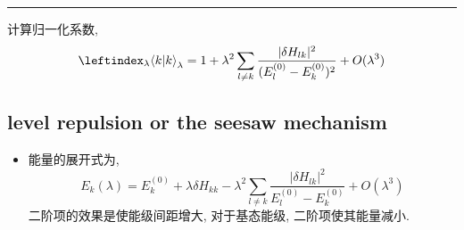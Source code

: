 \begin{itemize}
\begin{tcolorbox}[title=calculation:]
		\noindent\rule[0.5ex]{\linewidth}{0.5pt} %
		
		计算归一化系数,
		\begin{equation}
			\leftindex_\lambda {\braket{k | k}}_\lambda = 1 + \lambda^2 \sum_{l \neq k} \frac{|\delta H_{l k}|^2}{(E_l^{(0)} - E_k^{(0)})^2} + O(\lambda^3)
		\end{equation}
	\end{tcolorbox}
\end{itemize}

\subsection{level repulsion or the seesaw mechanism} \label{subsection C.1.1}
\begin{itemize}
	\item 能量的展开式为,
	\begin{equation}
		E_k(\lambda) = E_k^{(0)} + \lambda \delta H_{k k} - \lambda^2 \sum_{l \neq k} \frac{|\delta H_{l k}|^2}{E_l^{(0)} - E_k^{(0)}} + O(\lambda^3)
	\end{equation}
	二阶项的效果是使能级间距增大, 对于基态能级, 二阶项使其能量减小.
\end{itemize}

